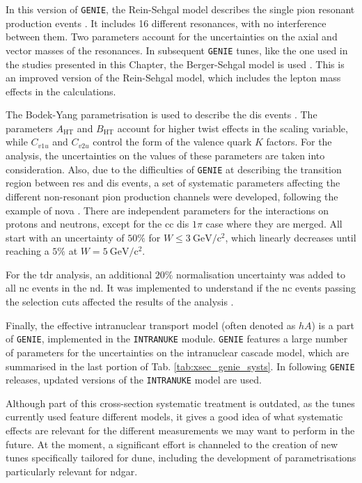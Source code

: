 In this version of \texttt{GENIE}, the Rein-Sehgal model describes the single pion resonant production events \cite{Rein1980}. It includes 16 different resonances, with no interference between them. Two parameters account for the uncertainties on the axial and vector masses of the resonances. In subsequent \texttt{GENIE} tunes, like the one used in the studies presented in this Chapter, the Berger-Sehgal model is used \cite{Berger2007}. This is an improved version of the Rein-Sehgal model, which includes the lepton mass effects in the calculations.

The Bodek-Yang parametrisation is used to describe the \gls{dis} events \cite{Bodek2002}. The parameters $A_{\mathrm{HT}}$ and $B_{\mathrm{HT}}$ account for higher twist effects in the scaling variable, while $C_{v1u}$ and $C_{v2u}$ control the form of the valence quark $K$ factors. For the analysis, the uncertainties on the values of these parameters are taken into consideration. Also, due to the difficulties of \texttt{GENIE} at describing the transition region between \gls{res} and \gls{dis} events, a set of systematic parameters affecting the different non-resonant pion production channels were developed, following the example of \gls{nova} \cite{Sanchez2018}. There are independent parameters for the interactions on protons and neutrons, except for the \gls{cc} \gls{dis} $1\pi$ case where they are merged. All start with an uncertainty of $50\%$ for $W \leq 3~\mathrm{GeV/c^{2}}$, which linearly decreases until reaching a $5\%$ at $W = 5~\mathrm{GeV/c^{2}}$.

For the \gls{tdr} analysis, an additional $20\%$ normalisation uncertainty was added to all \gls{nc} events in the \gls{nd}. It was implemented to understand if the \gls{nc} events passing the selection cuts affected the results of the analysis \cite{DUNE2021}.

Finally, the effective intranuclear transport model (often denoted as $hA$) is a part of \texttt{GENIE}, implemented in the \texttt{INTRANUKE} module. \texttt{GENIE} features a large number of parameters for the uncertainties on the intranuclear cascade model, which are summarised in the last portion of Tab. \ref{tab:xsec_genie_systs}. In following \texttt{GENIE} releases, updated versions of the \texttt{INTRANUKE} model are used.

Although part of this cross-section systematic treatment is outdated, as the tunes currently used feature different models, it gives a good idea of what systematic effects are relevant for the different measurements we may want to perform in the future. At the moment, a significant effort is channeled to the creation of new tunes specifically tailored for \gls{dune}, including the development of parametrisations particularly relevant for \gls{ndgar}.

